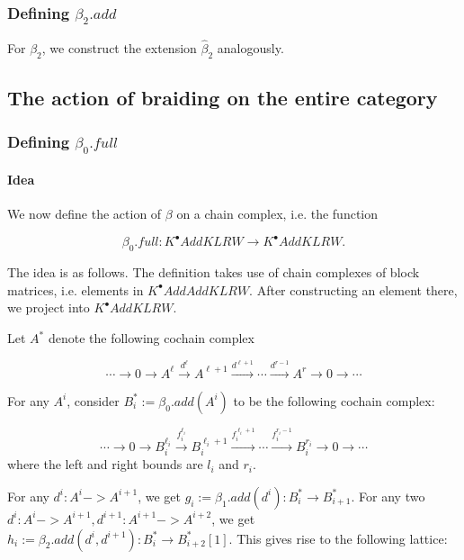 \subsubsection{Defining $\beta_2.add$}

For $\beta_2$, we construct the extension $\widehat{\beta}_2$ analogously.

\subsection{The action of braiding on the entire category}
\subsubsection{Defining $\beta_0.full$}

\paragraph{Idea}

We now define the action of $\beta$ on a chain complex, i.e. the function

\begin{equation*}
    \beta_0.full: K^\bullet AddKLRW
\rightarrow K^\bullet AddKLRW.
\end{equation*}

The idea is as follows. The definition takes use of chain complexes of block matrices, i.e. elements in $K^\bullet AddAddKLRW$. After constructing an element there, we project into $K^\bullet AddKLRW$.

Let $A^*$ denote the following cochain complex

\[
\cdots \to 0 \to A^{\ell} \xrightarrow{d^{\ell}} A^{\ell+1} \xrightarrow{d^{\ell+1}} \cdots \xrightarrow{d^{r-1}} A^{r} \to 0 \to \cdots
\]

For any $A^i$, consider $B_i ^*:=\beta_0.add(A^i)$ to be the following cochain complex:

\[
\cdots \to 0 \to B^{\ell_i}_{i} \xrightarrow{f_i^{\ell_i}} B^{\ell_i+1}_{i} \xrightarrow{f_i^{\ell_i+1}} \cdots \xrightarrow{f_i^{r_i-1}} B^{r_i}_{i} \to 0 \to \cdots
\]
where the left and right bounds are $l_i$ and $r_i$.

For any $d^i:A^i -> A^{i+1}$, we get $g_i:=\beta_1.add(d^i): B_i ^* \to B_{i+1}^*$. For any two $d^i:A^i -> A^{i+1}, d^{i+1}:A^{i+1} -> A^{i+2}$, we get $h_i:=\beta_2.add(d^i,d^{i+1}): B_i ^* \to B_{i+2}^*[1]$. This gives rise to the following lattice:



